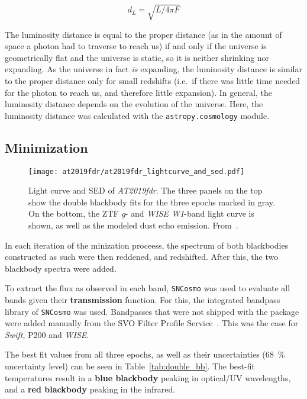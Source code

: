 \begin{equation}
    d_L = \sqrt{L/4\pi F}
\end{equation}

The luminosity distance is equal to the proper distance (as in the amount of space a photon had to traverse to reach us) if and only if the universe is geometrically flat and the universe is static, so it is neither shrinking nor expanding. As the universe in fact \textit{is} expanding, the luminosity distance is similar to the proper distance only for small redshifts (i.e.\ if there was little time needed for the photon to reach us, and therefore little expansion). In general, the luminosity distance depends on the evolution of the universe. Here, the luminosity distance was calculated with the \texttt{astropy.cosmology} module.

\subsection{Minimization}

\begin{figure*}[htb]
    \texttt{[image: at2019fdr/at2019fdr\_lightcurve\_and\_sed.pdf]}
    \caption[\emph{AT2019fdr} light and SED]{Light curve and SED of \emph{AT2019fdr}. The three panels on the top show the double blackbody fits for the three epochs marked in gray. On the bottom, the ZTF \textit{g}- and \textit{WISE W1}-band light curve is shown, as well as the modeled dust echo emission. From~\cite{Reusch2022}.}
\end{figure*}

In each iteration of the minization proceess, the spectrum of both blackbodies constructed as such were then reddened, and redshifted. After this, the two blackbody spectra were added.

To extract the flux as observed in each band, \texttt{SNCosmo} was used to evaluate all bands given their \textbf{transmission} function. For this, the integrated bandpass library of \texttt{SNCosmo} was used. Bandpasses that were not shipped with the package were added manually from the SVO Filter Profile Service~. This was the case for \textit{Swift}, P200 and \textit{WISE}.

The best fit values from all three epochs, as well as their uncertainties (\SI{68}{\percent} uncertainty level) can be seen in Table~\ref{tab:double_bb}. The best-fit temperatures result in a \textbf{blue blackbody} peaking in optical/UV wavelengths, and a \textbf{red blackbody} peaking in the infrared.

